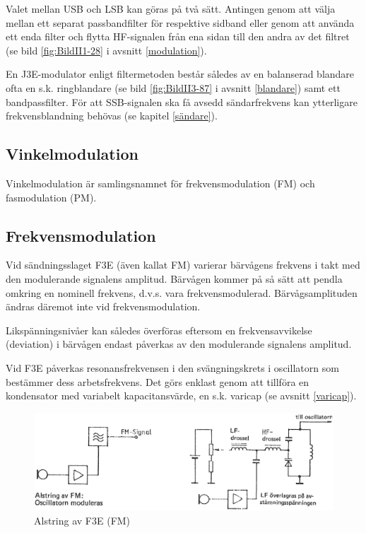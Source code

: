 Valet mellan USB och LSB kan göras på två sätt.
Antingen genom att välja mellan ett separat passbandfilter för respektive
sidband eller genom att använda ett enda filter och flytta HF-signalen från ena
sidan till den andra av det filtret (se bild \ref{fig:BildII1-28} i
avsnitt \ref{modulation}).

En J3E-modulator enligt filtermetoden består således av en balanserad
blandare ofta en s.k. ringblandare (se bild \ref{fig:BildII3-87} i avsnitt
\ref{blandare}) samt ett bandpassfilter.
För att SSB-signalen ska få avsedd sändarfrekvens kan ytterligare
frekvensblandning behövas (se kapitel \ref{sändare}).

\subsection{Vinkelmodulation}

Vinkelmodulation är samlingsnamnet för frekvensmodulation (FM) och
fasmodulation (PM).

\subsection{Frekvensmodulation}

Vid sändningsslaget F3E (även kallat FM) varierar bärvågens frekvens i
takt med den modulerande signalens amplitud.
Bärvågen kommer på så sätt att pendla omkring en nominell frekvens, d.v.s. vara
frekvensmodulerad.
Bärvågsamplituden ändras däremot inte vid frekvensmodulation.

Likspänningsnivåer kan således överföras eftersom en frekvensavvikelse
(deviation) i bärvågen endast påverkas av den modulerande signalens amplitud.

Vid F3E påverkas resonansfrekvensen i den svängningskrets i oscillatorn som
bestämmer dess arbetsfrekvens.
Det görs enklast genom att tillföra en kondensator med variabelt
kapacitansvärde, en s.k. varicap (se avsnitt \ref{varicap}).

\begin{figure}
\includegraphics[width=\textwidth]{images/cropped_pdfs/bild_2_3-91.pdf}
\caption{Alstring av F3E (FM)}
\label{fig:BildII3-91}
\end{figure}

